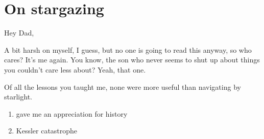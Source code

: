 \section*{On stargazing}

\noindent Hey Dad,

\begin{noteblock}{A bit harsh on myself, I guess, but no one is going to read this anyway, so who cares?}
It's me again.
You know, the son who never seems to shut up about things you couldn't care less about?
Yeah, that one.
\end{noteblock}

Of all the lessons you taught me, none were more useful than navigating by starlight.

\begin{enumerate}
\item{gave me an appreciation for history}
\item{Kessler catastrophe}
\end{enumerate}

